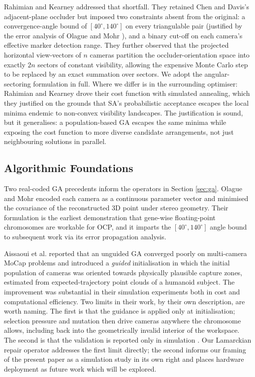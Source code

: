 \documentclass[conference]{IEEEtran}
\begin{document}
Rahimian and Kearney \cite{rahimian_optimal_2017} addressed that shortfall. They retained Chen and Davis's adjacent-plane occluder but imposed two constraints absent from the original: a convergence-angle bound of $[40^\circ, 140^\circ]$ on every triangulable pair (justified by the error analysis of Olague and Mohr \cite{olague_optimal_2002}), and a binary cut-off on each camera's effective marker detection range. They further observed that the projected horizontal view-vectors of $n$ cameras partition the occluder-orientation space into exactly $2n$ sectors of constant visibility, allowing the expensive Monte Carlo step to be replaced by an exact summation over sectors. We adopt the angular-sectoring formulation in full. Where we differ is in the surrounding optimiser: Rahimian and Kearney drove their cost function with simulated annealing, which they justified on the grounds that SA's probabilistic acceptance escapes the local minima endemic to non-convex visibility landscapes. The justification is sound, but it generalises: a population-based GA escapes the same minima while exposing the cost function to more diverse candidate arrangements, not just neighbouring solutions in parallel.

\subsection{Algorithmic Foundations}

Two real-coded GA precedents inform the operators in Section \ref{sec:ga}. Olague and Mohr \cite{olague_optimal_2002} encoded each camera as a continuous parameter vector and minimised the covariance of the reconstructed 3D point under stereo geometry. Their formulation is the earliest demonstration that gene-wise floating-point chromosomes are workable for OCP, and it imparts the $[40^\circ,140^\circ]$ angle bound to subsequent work via its error propagation analysis.

Aissaoui et al.\cite{aissaoui_designing_2018} reported that an unguided GA converged poorly on multi-camera MoCap problems and introduced a \emph{guided} initialisation in which the initial population of cameras was oriented towards physically plausible capture zones, estimated from expected-trajectory point clouds of a humanoid subject. The improvement was substantial in their simulation experiments both in cost and computational efficiency. Two limits in their work, by their own description, are worth naming. The first is that the guidance is applied only at initialisation; selection pressure and mutation then drive cameras anywhere the chromosome allows, including back into the geometrically invalid interior of the workspace. The second is that the validation is reported only in simulation \cite{aissaoui_designing_2018}. Our Lamarckian repair operator addresses the first limit directly; the second informs our framing of the present paper as a simulation study in its own right and places hardware deployment as future work which will be explored.
\end{document}
